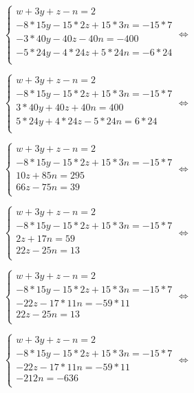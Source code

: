 \begin{enumerate}
\begin{multicols}{2}
	$ \begin{cases}
	w + 3y + z - n = 2 \\
	 -8*15y - 15*2z + 15*3n = -15*7\\
	 -3*40y -40z -40n = -400\\
	  -5*24y - 4*24z + 5*24n = -6*24\\
	\end{cases}  \Longleftrightarrow $

	$ \begin{cases}
	w + 3y + z - n = 2 \\
	 -8*15y - 15*2z + 15*3n = -15*7\\
	 3*40y +40z +40n = 400\\
	  5*24y + 4*24z - 5*24n = 6*24\\
	\end{cases}  \Longleftrightarrow $

	$ \begin{cases}
	w + 3y + z - n = 2 \\
	 -8*15y - 15*2z + 15*3n = -15*7\\
	 10z +85n = 295\\
	  66z - 75n = 39\\
	\end{cases}  \Longleftrightarrow $

	$ \begin{cases}
	w + 3y + z - n = 2 \\
	 -8*15y - 15*2z + 15*3n = -15*7\\
	  2z +17n = 59\\
	  22z - 25n = 13\\
	\end{cases}  \Longleftrightarrow $

	$ \begin{cases}
	w + 3y + z - n = 2 \\
	 -8*15y - 15*2z + 15*3n = -15*7\\
	  -22z -17*11n = -59*11\\
	  22z - 25n = 13\\
	\end{cases}  \Longleftrightarrow $

	$ \begin{cases}
	w + 3y + z - n = 2 \\
	 -8*15y - 15*2z + 15*3n = -15*7\\
	  -22z -17*11n = -59*11\\
	   - 212n = -636\\
	\end{cases}  \Longleftrightarrow $


\end{multicols}
\end{enumerate}
